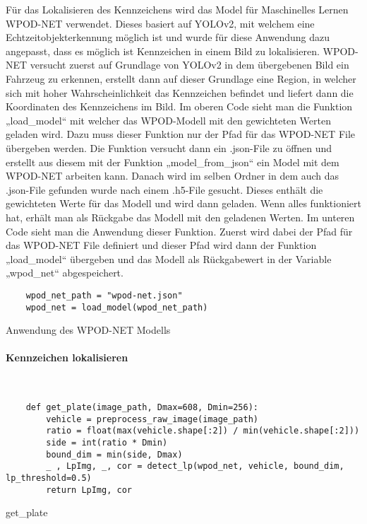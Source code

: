 Für das Lokalisieren des Kennzeichens wird das Model für Maschinelles Lernen WPOD-NET verwendet. Dieses basiert auf YOLOv2, 
mit welchem eine Echtzeitobjekterkennung möglich ist und wurde für diese Anwendung dazu angepasst, dass es möglich ist 
Kennzeichen in einem Bild zu lokalisieren. WPOD-NET versucht zuerst auf Grundlage von YOLOv2 in dem übergebenen Bild 
ein Fahrzeug zu erkennen, erstellt dann auf dieser Grundlage eine Region, in welcher sich mit hoher Wahrscheinlichkeit 
das Kennzeichen befindet und liefert dann die Koordinaten des Kennzeichens im Bild. Im oberen Code sieht man die Funktion 
„load{\_}model“ mit welcher das WPOD-Modell mit den gewichteten Werten geladen wird. Dazu muss dieser Funktion nur der 
Pfad für das WPOD-NET File übergeben werden. Die Funktion versucht dann ein .json-File zu öffnen und erstellt aus 
diesem mit der Funktion „model{\_}from{\_}json“ ein Model mit dem WPOD-NET arbeiten kann. Danach wird im selben Ordner 
in dem auch das .json-File gefunden wurde nach einem .h5-File gesucht. Dieses enthält die gewichteten Werte für das 
Modell und wird dann geladen. Wenn alles funktioniert hat, erhält man als Rückgabe das Modell mit den geladenen Werten. 
Im unteren Code sieht man die Anwendung dieser Funktion. Zuerst wird dabei der Pfad für das WPOD-NET File definiert und 
dieser Pfad wird dann der Funktion „load{\_}model“ übergeben und das Modell als Rückgabewert in der Variable „wpod{\_}net“ abgespeichert.

\begin{listing}[H]
    \begin{verbatim}
    wpod_net_path = "wpod-net.json"
    wpod_net = load_model(wpod_net_path)
    \end{verbatim}
    \caption{Anwendung des WPOD-NET Modells}
\end{listing}

\paragraph{Kennzeichen lokalisieren}\mbox{}\\

\begin{listing}[H]
    \begin{verbatim}
    def get_plate(image_path, Dmax=608, Dmin=256):
        vehicle = preprocess_raw_image(image_path)
        ratio = float(max(vehicle.shape[:2]) / min(vehicle.shape[:2]))
        side = int(ratio * Dmin)
        bound_dim = min(side, Dmax)
        _ , LpImg, _, cor = detect_lp(wpod_net, vehicle, bound_dim, lp_threshold=0.5)
        return LpImg, cor
    \end{verbatim}
    \caption{get{\_}plate}
\end{listing}

